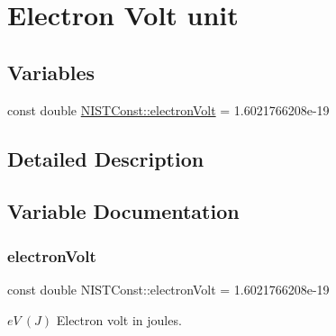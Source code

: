 \hypertarget{group___n_i_s_t_const-_electron_volt_unit}{}\section{Electron Volt unit}
\label{group___n_i_s_t_const-_electron_volt_unit}
\subsection*{Variables}
\begin{DoxyCompactItemize}
\item 
const double \mbox{\hyperlink{group___n_i_s_t_const-_electron_volt_unit_ga24c6771adb5c4de68575b1a77f0b2415}{N\+I\+S\+T\+Const\+::electron\+Volt}} = 1.\+6021766208e-\/19
\end{DoxyCompactItemize}


\subsection{Detailed Description}


\subsection{Variable Documentation}
\mbox{\label{group___n_i_s_t_const-_electron_volt_unit_ga24c6771adb5c4de68575b1a77f0b2415}} 
\subsubsection{\texorpdfstring{electron\+Volt}{electronVolt}}
{\footnotesize\ttfamily const double N\+I\+S\+T\+Const\+::electron\+Volt = 1.\+6021766208e-\/19}

$eV \ (J)$ Electron volt in joules. 